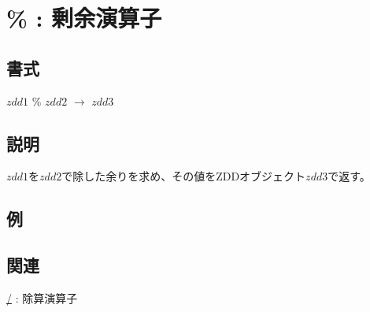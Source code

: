 
\section{\% : 剰余演算子\label{sect:remainder}}
\subsection*{書式}
$zdd1$ \% $zdd2$ $\rightarrow$ $zdd3$

\subsection*{説明}
$zdd1$を$zdd2$で除した余りを求め、その値をZDDオブジェクト$zdd3$で返す。

\subsection*{例}


\subsection*{関連}
\hyperref[sect:quotiment]{/} : 除算演算子
